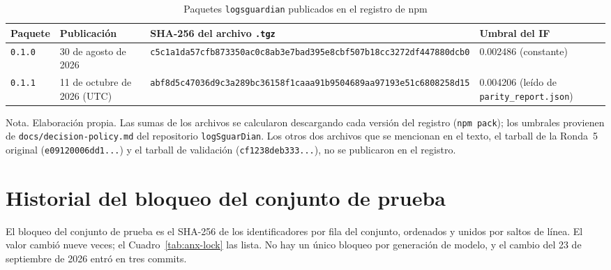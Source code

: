 \begin{table}[H]
\centering
\small
\begin{tabular}{|L{2.3cm}|L{2.5cm}|L{6.2cm}|L{2.5cm}|}
\hline
\textbf{Paquete} & \textbf{Publicación} & \textbf{SHA-256 del archivo \texttt{.tgz}} & \textbf{Umbral del IF} \\ \hline
\texttt{0.1.0} & 30 de agosto de 2026 & {\scriptsize\texttt{c5c1a1da57cfb873350ac0c8ab3e7bad395e8cbf507b18cc3272df447880dcb0}} & 0.002486 (constante) \\ \hline
\texttt{0.1.1} & 11 de octubre de 2026 (UTC) & {\scriptsize\texttt{abf8d5c47036d9c3a289bc36158f1caaa91b9504689aa97193e51c6808258d15}} & 0.004206 (leído de \texttt{parity\_report.json}) \\ \hline
\end{tabular}
\caption[Paquetes publicados en npm]{Paquetes \texttt{logsguardian} publicados en el registro de npm}
\label{tab:anx-paquetes}
\end{table}
{\footnotesize Nota. Elaboración propia. Las sumas de los archivos se calcularon descargando cada
versión del registro (\texttt{npm pack}); los umbrales provienen de \texttt{docs/decision-policy.md}
del repositorio \texttt{logSguarDian}. Los otros dos archivos que se mencionan en el texto, el
tarball de la Ronda~5 original (\texttt{e09120006dd1...}) y el tarball de validación
(\texttt{cf1238deb333...}), no se publicaron en el registro.}

\section{Historial del bloqueo del conjunto de prueba}
\label{anx:lock}

El bloqueo del conjunto de prueba es el SHA-256 de los identificadores por fila del conjunto,
ordenados y unidos por saltos de línea. El valor cambió nueve veces; el Cuadro~\ref{tab:anx-lock}
las lista. No hay un único bloqueo por generación de modelo, y el cambio del 23 de septiembre de
2026 entró en tres commits.

